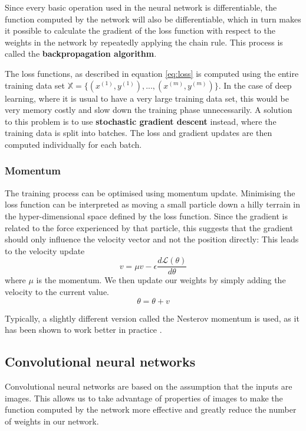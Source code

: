 \documentclass[12pt,a4paper,twoside,openright]{report}
\begin{document}
Since every basic operation used in the neural network is differentiable, the function computed by the network will also be differentiable, which in turn makes it possible to calculate the gradient of the loss function with respect to the weights in the network by repeatedly applying the chain rule. This process is called the \textbf{backpropagation algorithm}.

The loss functions, as described in equation \ref{eq:loss} is computed using the entire training data set $\mathbb{X} = \{(x^{(1)},y^{(1)}), ...,(x^{(m)},y^{(m)})\}$. In the case of deep learning, where it is usual to have a very large training data set, this would be very memory costly and slow down the training phase unnecessarily. A solution to this problem is to use \textbf{stochastic gradient descent} instead, where the training data is split into batches. The loss and gradient updates are then computed individually for each batch.

\subsubsection{Momentum}
The training process can be optimised using momentum update. Minimising the loss function can be interpreted as moving a small particle down a hilly terrain in the hyper-dimensional space defined by the loss function. Since the gradient is related to the force experienced by that particle, this suggests that the gradient should only influence the velocity vector and not the position directly: This leads to the velocity update
\begin{equation}
	v = \mu  v - \epsilon \frac{d\mathcal{L}(\theta)}{d\theta}
\end{equation}
where $\mu$ is the momentum. We then update our weights by simply adding the velocity to the current value.
\begin{equation}
	\theta = \theta + v
\end{equation}

Typically, a slightly different version called the Nesterov momentum is used, as it has been shown to work better in practice \cite{nesterov_momentum}.

\subsection{Convolutional neural networks}
Convolutional neural networks are based on the assumption that the inputs are images. This allows us to take advantage of properties of images to make the function computed by the network more effective and greatly reduce the number of weights in our network. 
\end{document}
